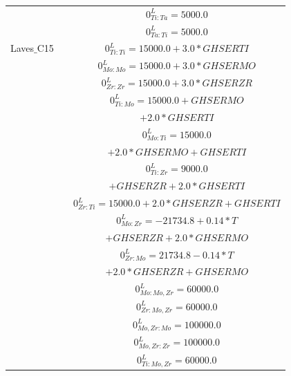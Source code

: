 \begin{longtable}[H]{ c c c }
                              & \cite{Ansara1998} & $0^\textit{L}_{Ti:Ta} = 5000.0$\\
                              & \cite{Ansara1998} & $0^\textit{L}_{Ta:Ti} = 5000.0$\\
       Laves$\_$C15 & \cite{Kar2008} & $0^\textit{L}_{Ti:Ti} = 15000.0+3.0*GHSERTI$\\
                               & \cite{Perez2003} & $0^\textit{L}_{Mo:Mo} = 15000.0+3.0*GHSERMO$\\
                               & \cite{Perez2003}  & $0^\textit{L}_{Zr:Zr} = 15000.0+3.0*GHSERZR$\\
                               & \cite{Kar2008} & $0^\textit{L}_{Ti:Mo} = 15000.0+GHSERMO$\\
                               &                        & $+2.0*GHSERTI$\\
                               & \cite{Kar2008} & $0^\textit{L}_{Mo:Ti} = 15000.0$\\
                               &                        & $+2.0*GHSERMO+GHSERTI$\\
                               & \cite{Kar2008} & $0^\textit{L}_{Ti:Zr} = 9000.0$\\
                               &                        & $+GHSERZR+2.0*GHSERTI$\\
                               & \cite{Kar2008} & $0^\textit{L}_{Zr:Ti} = 15000.0+2.0*GHSERZR+GHSERTI$\\
                               & \cite{Perez2003}  & $0^\textit{L}_{Mo:Zr} = -21734.8+0.14*T$\\
                               &                             & $+GHSERZR+2.0*GHSERMO$\\
                               & \cite{Perez2003}  & $0^\textit{L}_{Zr:Mo} = 21734.8-0.14*T$\\
                               &                             & $+2.0*GHSERZR+GHSERMO$\\
                               & \cite{Perez2003} & $0^\textit{L}_{Mo:Mo,Zr} = 60000.0$\\
                               & \cite{Perez2003} & $0^\textit{L}_{Zr:Mo,Zr} = 60000.0$\\
                               & \cite{Perez2003}  & $0^\textit{L}_{Mo,Zr:Mo} = 100000.0$\\
                               & \cite{Perez2003}  & $0^\textit{L}_{Mo,Zr:Zr} = 100000.0$\\
                               & \cite{Kar2008} & $0^\textit{L}_{Ti:Mo,Zr} = 60000.0$\\

\end{longtable}
